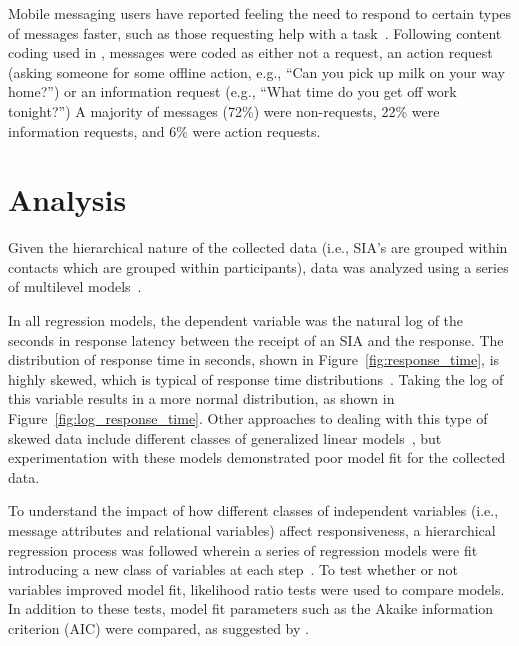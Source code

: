 \documentclass[12pt]{nuthesis}	%
\begin{document}
Mobile messaging users have reported feeling the need to respond to certain types of messages faster, such as those requesting help with a task~\citep{cui2016beyond}. Following content coding used in \citet{dabbish2005understanding}, messages were coded as either not a request, an action request (asking someone for some offline action, e.g., ``Can you pick up milk on your way home?'') or an information request (e.g., ``What time do you get off work tonight?'') A majority of messages (72\%) were non-requests, 22\% were information requests, and 6\% were action requests.

\section{Analysis}

Given the hierarchical nature of the collected data (i.e., SIA's are grouped within contacts which are grouped within participants), data was analyzed using a series of multilevel models~\citep{gelman2007data}.

In all regression models, the dependent variable was the natural log of the seconds in response latency between the receipt of an SIA and the response. The distribution of response time in seconds, shown in Figure~\ref{fig:response_time}, is highly skewed, which is typical of response time distributions~\citep{kalman2006pauses}. Taking the log of this variable results in a more normal distribution, as shown in Figure~\ref{fig:log_response_time}. Other approaches to dealing with this type of skewed data include different classes of generalized linear models~\citep[see e.g.,][]{buntin2004too,dick2004beyond,manning2001estimating}, but experimentation with these models demonstrated poor model fit for the collected data.

To understand the impact of how different classes of independent variables (i.e., message attributes and relational variables) affect responsiveness, a hierarchical regression process was followed wherein a series of regression models were fit introducing a new class of variables at each step~\citep{gurnsey2017statistics}. To test whether or not variables improved model fit, likelihood ratio tests were used to compare models. In addition to these tests, model fit parameters such as the Akaike information criterion (AIC) were compared, as suggested by \citet{gelman2007data}.
\end{document}
